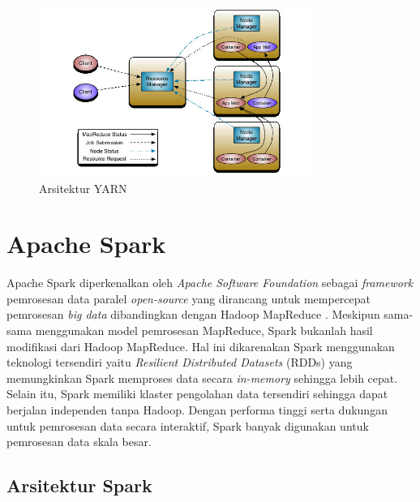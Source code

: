 \begin{figure}[h!]
    \centering
    \includegraphics[width=0.8\textwidth]{figures/ch02/yarn-arch}
    \caption{Arsitektur YARN \cite{ApacheHadoopApache}}
    \label{fig:yarn_arch}
\end{figure}

\section{Apache Spark}
Apache Spark diperkenalkan oleh \textit{Apache Software Foundation} sebagai \textit{framework} pemrosesan data paralel \textit{open-source} yang dirancang untuk mempercepat pemrosesan \textit{big data} dibandingkan dengan  Hadoop MapReduce \cite{ApacheSparkUnified}. Meskipun sama-sama menggunakan model pemrosesan MapReduce, Spark bukanlah hasil modifikasi dari Hadoop MapReduce. Hal ini dikarenakan Spark menggunakan teknologi tersendiri yaitu \textit{Resilient Distributed Datasets} (RDDs) yang memungkinkan Spark memproses data secara \textit{in-memory} sehingga lebih cepat. Selain itu, Spark memiliki klaster pengolahan data tersendiri sehingga dapat berjalan independen tanpa Hadoop. Dengan performa tinggi serta dukungan untuk pemrosesan data secara interaktif, Spark banyak digunakan untuk pemrosesan data skala besar. 

\subsection{Arsitektur Spark}

